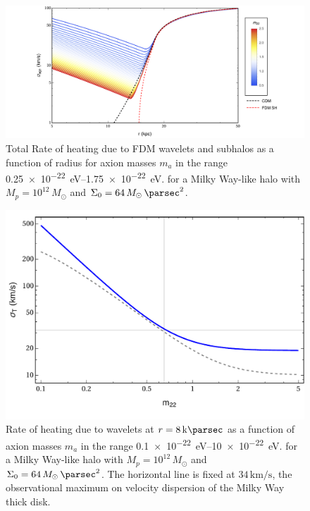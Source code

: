 \documentclass[usenatbib]{mnras}
\begin{document}
\begin{figure}
\includegraphics[width=13cm]{FDM_velocity}
\vspace*{-5mm}
\caption{Total Rate of heating due to FDM wavelets and subhalos as a function of radius for axion masses $m_{a}$ in the range \SIrange{0.25 e-22}{ 1.75 e-22}{\electronvolt}. for a Milky Way-like halo with $M_p = 10^{12} \, M_\odot$ and $\Sigma_0 = 64 \, M_\odot \, \si{\per\parsec^2}$.}
\label{fig:radiusheating}
\end{figure}

\begin{figure}
\includegraphics[width=\columnwidth]{FDM_mass_dep}
\vspace*{-5mm}
\caption{Rate of heating due to wavelets at $r = 8\, \si{\kilo \parsec}$ as a function of axion masses $m_{a}$ in the range \SIrange{0.1 e-22}{ 10 e-22}{\electronvolt}. for a Milky Way-like halo with $M_p = 10^{12} \, M_\odot$ and $\Sigma_0 = 64 \, M_\odot \, \si{\per\parsec^2}$. The horizontal line is fixed at $34\, \si{\kilo\meter\per\second}$, the observational maximum on velocity dispersion of the Milky Way thick disk. }
\label{fig:radiusheating}
\end{figure}
\end{document}
